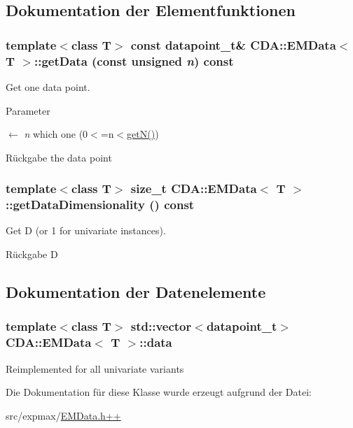 \subsection{Dokumentation der Elementfunktionen}
\hypertarget{classCDA_1_1EMData_ab1acf83827d4595d2cb68c90bf7fa175}{
\subsubsection[{getData}]{\setlength{\rightskip}{0pt plus 5cm}template$<$class T$>$ const {\bf datapoint\_\-t}\& {\bf CDA::EMData}$<$ T $>$::getData (const unsigned {\em n}) const}}
\label{classCDA_1_1EMData_ab1acf83827d4595d2cb68c90bf7fa175}


Get one data point. 


\begin{DoxyParams}{Parameter}
\item[\mbox{$\leftarrow$} {\em n}]which one (0$<$=n$<$\hyperlink{classCDA_1_1EMData_ac0839f5918bd704f111fc96183422c17}{getN()})\end{DoxyParams}
\begin{DoxyReturn}{Rückgabe}
the data point 
\end{DoxyReturn}
\hypertarget{classCDA_1_1EMData_afa10d17ad30e4f69523ae38f83e31d43}{
\subsubsection[{getDataDimensionality}]{\setlength{\rightskip}{0pt plus 5cm}template$<$class T$>$ size\_\-t {\bf CDA::EMData}$<$ T $>$::getDataDimensionality () const}}
\label{classCDA_1_1EMData_afa10d17ad30e4f69523ae38f83e31d43}


Get D (or 1 for univariate instances). 

\begin{DoxyReturn}{Rückgabe}
D 
\end{DoxyReturn}


\subsection{Dokumentation der Datenelemente}
\hypertarget{classCDA_1_1EMData_a2c3eec1a4ba1476128790235bf814a21}{
\subsubsection[{data}]{\setlength{\rightskip}{0pt plus 5cm}template$<$class T$>$ std::vector$<${\bf datapoint\_\-t}$>$ {\bf CDA::EMData}$<$ T $>$::{\bf data}}}
\label{classCDA_1_1EMData_a2c3eec1a4ba1476128790235bf814a21}
Reimplemented for all univariate variants 

Die Dokumentation für diese Klasse wurde erzeugt aufgrund der Datei:\begin{DoxyCompactItemize}
\item 
src/expmax/\hyperlink{EMData_8h_09_09}{EMData.h++}\end{DoxyCompactItemize}

